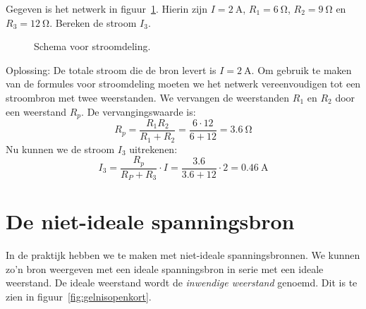 \begin{example}[Stroomdeling]
Gegeven is het netwerk in figuur~\ref{fig:gelstroomdeling2}. Hierin zijn $I=\SI{2}{\ampere}$, $R_1=\SI{6}{\ohm}$,
$R_2=\SI{9}{\ohm}$ en $R_3=\SI{12}{\ohm}$. Bereken de stroom $I_3$.
\begin{figure}[H]
\centering
{}
\caption{Schema voor stroomdeling.}
\label{fig:gelstroomdeling2}
\end{figure}
Oplossing: De totale stroom die de bron levert is $I=\SI{2}{\ampere}$. Om gebruik te maken van de formules
voor stroomdeling moeten we het netwerk vereenvoudigen tot een stroombron met twee weerstanden. We vervangen
de weerstanden $R_1$ en $R_2$ door een weerstand $R_p$. De vervangingswaarde is:
\begin{equation}
R_p = \dfrac{R_1R_2}{R_1+R_2} = \dfrac{6\cdot12}{6+12} = \SI{3.6}{\ohm}
\end{equation}
Nu kunnen we de stroom $I_3$ uitrekenen:
\begin{equation}
I_3 = \dfrac{R_p}{R_P+R_3}\cdot I = \dfrac{\num{3.6}}{\num{3.6}+\num{12}}\cdot \num{2} = \SI{0.46}{\ampere}
\end{equation}
\end{example}


\section{De niet-ideale spanningsbron}
\label{sec:gelnietidealespanningsbron}
In de praktijk hebben we te maken met niet-ideale spanningsbronnen. We kunnen zo'n bron
weergeven met een ideale spanningsbron in serie met een ideale weerstand. De ideale
weerstand wordt de \textsl{inwendige weerstand} genoemd. Dit is te zien in
figuur~\ref{fig:gelnisopenkort}.


